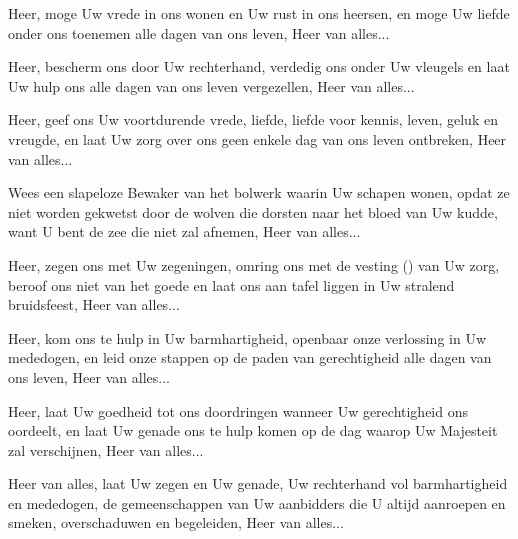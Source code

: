 \documentclass[12pt,twoside,a5paper]{article}
\begin{document}
\begin{halfparskip}
   Heer, moge Uw vrede in ons wonen en Uw rust in ons heersen, en moge Uw liefde onder ons toenemen alle dagen van ons leven, Heer van alles...

   Heer, bescherm ons door Uw rechterhand, verdedig ons onder Uw vleugels en laat Uw hulp ons alle dagen van ons leven vergezellen, Heer van alles...

   Heer, geef ons Uw voortdurende vrede, liefde, liefde voor kennis, leven, geluk en vreugde, en laat Uw zorg over ons geen enkele dag van ons leven ontbreken, Heer van alles...

   Wees een slapeloze Bewaker van het bolwerk waarin Uw schapen wonen, opdat ze niet worden gekwetst door de wolven die dorsten naar het bloed van Uw kudde, want U bent de zee die niet zal afnemen, Heer van alles...

   Heer, zegen ons met Uw zegeningen, omring ons met de vesting () van Uw zorg, beroof ons niet van het goede en laat ons aan tafel liggen in Uw stralend bruidsfeest, Heer van alles...

   Heer, kom ons te hulp in Uw barmhartigheid, openbaar onze verlossing in Uw mededogen, en leid onze stappen op de paden van gerechtigheid alle dagen van ons leven, Heer van alles...

   Heer, laat Uw goedheid tot ons doordringen wanneer Uw gerechtigheid ons oordeelt, en laat Uw genade ons te hulp komen op de dag waarop Uw Majesteit zal verschijnen, Heer van alles...

   Heer van alles, laat Uw zegen en Uw genade, Uw rechterhand vol barmhartigheid en mededogen, de gemeenschappen van Uw aanbidders die U altijd aanroepen en smeken, overschaduwen en begeleiden, Heer van alles...
\end{halfparskip}


\end{document}
